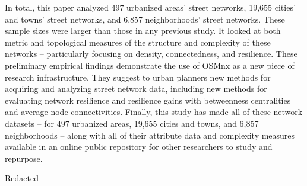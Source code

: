 \documentclass[Afour,sageh,times]{sage/sagej}
\begin{document}
In total, this paper analyzed 497 urbanized areas' street networks, 19,655 cities' and towns' street networks, and 6,857 neighborhoods' street networks. These sample sizes were larger than those in any previous study. It looked at both metric and topological measures of the structure and complexity of these networks – particularly focusing on density, connectedness, and resilience. These preliminary empirical findings demonstrate the use of OSMnx as a new piece of research infrastructure. They suggest to urban planners new methods for acquiring and analyzing street network data, including new methods for evaluating network resilience and resilience gains with betweenness centralities and average node connectivities. Finally, this study has made all of these network datasets – for 497 urbanized areas, 19,655 cities and towns, and 6,857 neighborhoods – along with all of their attribute data and complexity measures available in an online public repository for other researchers to study and repurpose.

\begin{acks}
Redacted
\end{acks}

\begin{thebibliography}{}



\end{thebibliography}
\end{document}
